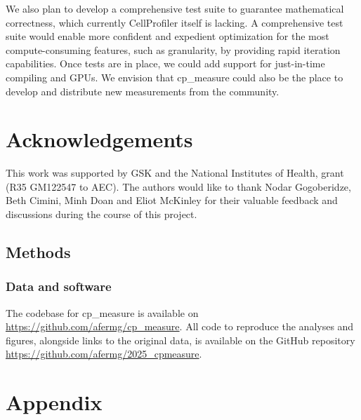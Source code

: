 \documentclass{article}
\begin{document}
We also plan to develop a comprehensive test suite to guarantee mathematical correctness, which currently CellProfiler itself is lacking. A comprehensive test suite would enable more confident and expedient optimization for the most compute-consuming features, such as granularity, by providing rapid iteration capabilities. Once tests are in place, we could add support for just-in-time compiling and GPUs. We envision that cp\_measure could also be the place to develop and distribute new measurements from the community. 


\section{Acknowledgements}
\label{sec:acknowledgements}

This work was supported by GSK and the National Institutes of Health, grant (R35 GM122547 to AEC). The authors would like to thank Nodar Gogoberidze, Beth Cimini, Minh Doan and Eliot McKinley for their valuable feedback and discussions during the course of this project.

\subsection{Methods}
\label{sec:orgb3e9382}
\subsubsection{Data and software}
\label{sec:orgbda0ae2}
The codebase for cp\_measure is available on \url{https://github.com/afermg/cp_measure}. All code to reproduce the analyses and figures, alongside links to the original data, is available on the GitHub repository \url{https://github.com/afermg/2025_cpmeasure}.





\onecolumn
\section{Appendix}

\appendix
\setcounter{figure}{0}
\renewcommand{\thefigure}{A\arabic{figure}}
\end{document}
